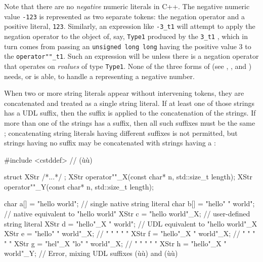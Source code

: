 Note that there are no \emph{negative} numeric literals in C++. The
negative numeric value \lstinline!-123! is represented as two separate
tokens: the negation operator and a positive literal, \lstinline!123!.
Similarly, an expression like \lstinline!-3_t1! will attempt to apply the
negation operator to the object of, say, \lstinline!Type1! produced by the
\lstinline!3_t1! , which in turn comes from passing an
\lstinline!unsigned!~\lstinline!long!~\lstinline!long! having the positive value
3 to the  \lstinline!operator""_t1!. Such an
expression will be  unless there is a negation
operator that operates on \emph{rvalues} of type \lstinline!Type1!. None of
the three forms of  (see , , and ) needs, or
is able, to handle a  representing a negative
number.

When two or more string literals appear without intervening tokens, they
are concatenated and treated as a single string literal. If at least one of
those strings has a UDL suffix, then the suffix is applied to the concatenation
of the  strings. If more than one of the strings has a
suffix, then all such suffixes must be the same ;
concatenating string literals having different suffixes is not
permitted, but strings having no suffix may be concatenated with strings
having a :

\begin{emcppslisting}
#include <cstddef>  // (ù{}ù)

struct XStr { /*...*/ };
XStr operator""_X(const char* n, std::size_t length);
XStr operator""_Y(const char* n, std::size_t length);

char a[] = "hello world";            // single native string literal
char b[] = "hello"      " world";    // native equivalent to "hello world"
XStr c   = "hello world"_X;          // user-defined string literal
XStr d   = "hello"_X    " world";    // UDL equivalent to "hello world"_X
XStr e   = "hello"      " world"_X;  //  "      "      "     "     "
XStr f   = "hello"_X    " world"_X;  //  "      "      "     "     "
XStr g   = "hel"_X "lo" " world"_X;  //  "      "      "     "     "
XStr h   = "hello"_X    " world"_Y;  // Error, mixing UDL suffixes (ù{}ù) and (ù{}ù)
\end{emcppslisting}

